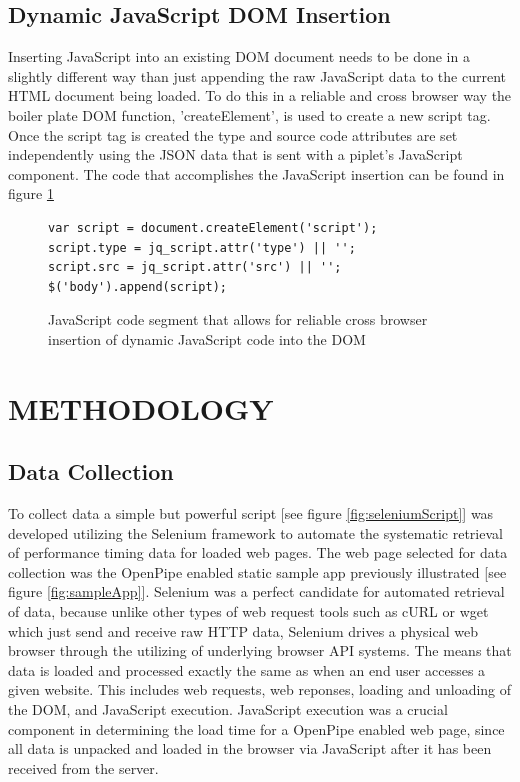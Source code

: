 \documentclass[12pt]{report}
\begin{document}
\section{Dynamic JavaScript DOM Insertion}

Inserting JavaScript into an existing DOM document needs to be done in a slightly different way than just appending the raw JavaScript data to the current HTML document being loaded. To do this in a reliable and cross browser way the boiler plate DOM function, 'createElement', is used to create a new script tag. Once the script tag is created the type and source code attributes are set independently using the JSON data that is sent with a piplet's JavaScript component. The code that accomplishes the JavaScript insertion can be found in figure \ref{fig:javascriptInsertion}

\begin{figure}[H]
\label{fig:javascriptInsertion}
\begin{lstlisting}
var script = document.createElement('script');
script.type = jq_script.attr('type') || '';
script.src = jq_script.attr('src') || '';
$('body').append(script);
\end{lstlisting}
\caption{JavaScript code segment that allows for reliable cross browser insertion of dynamic JavaScript code into the DOM}
\end{figure}

\chapter{METHODOLOGY}

\section{Data Collection}

To collect data a simple but powerful script [see figure \ref{fig:seleniumScript}] was developed utilizing the Selenium framework to automate the systematic retrieval of performance timing data for loaded web pages. The web page selected for data collection was the OpenPipe enabled static sample app previously illustrated [see figure \ref{fig:sampleApp}].  Selenium was a perfect candidate for automated retrieval of data, because unlike other types of web request tools such as cURL or wget which just send and receive raw HTTP data, Selenium drives a physical web browser through the utilizing of underlying browser API systems. The means that data is loaded and processed exactly the same as when an end user accesses a given website. This includes web requests, web reponses,  loading and unloading of the DOM,  and JavaScript execution. JavaScript execution was a crucial component in determining the load time for a OpenPipe enabled web page, since all data is unpacked and loaded in the browser via JavaScript after it has been received from the server.
\end{document}
